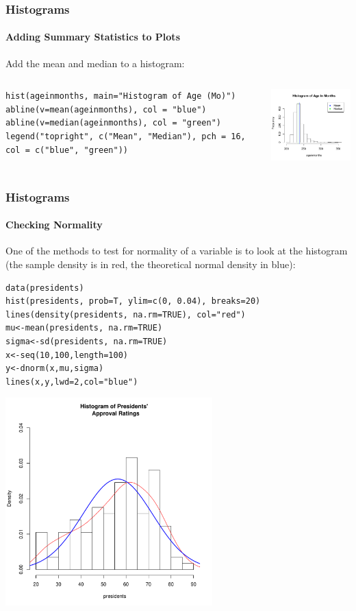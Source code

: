 \begin{frame}[fragile]
\frametitle{Histograms}
  \framesubtitle{Adding Summary Statistics to Plots}
Add the mean and median to a histogram:
    \begin{columns}

\begin{lstlisting}
hist(ageinmonths, main="Histogram of Age (Mo)")
abline(v=mean(ageinmonths), col = "blue")
abline(v=median(ageinmonths), col = "green")
legend("topright", c("Mean", "Median"), pch = 16, col = c("blue", "green"))
\end{lstlisting}

\begin{center}
\includegraphics[width = 45mm]{images/hist_meanmed.pdf}
\end{center}

\end{columns}
\end{frame}

\begin{frame}
\frametitle{Histograms}
\framesubtitle{Checking Normality}

One of the methods to test for normality of a variable is to look at the histogram (the sample density is in red, the theoretical normal density in blue):
  		\begin{lstlisting}
data(presidents)		
hist(presidents, prob=T, ylim=c(0, 0.04), breaks=20)
lines(density(presidents, na.rm=TRUE), col="red")
mu<-mean(presidents, na.rm=TRUE) 
sigma<-sd(presidents, na.rm=TRUE)
x<-seq(10,100,length=100) 
y<-dnorm(x,mu,sigma) 
lines(x,y,lwd=2,col="blue") 
		\end{lstlisting}

        \begin{center}
         \includegraphics[width=0.6\textwidth]{images/presHist.pdf}
        \end{center}
\end{frame}



